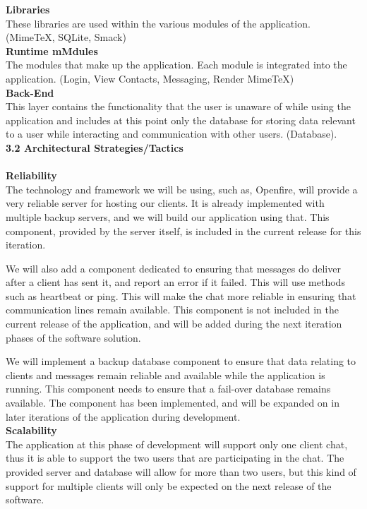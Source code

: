 \documentclass[29pt,a4paper]{moderncv}
\begin{document}
			\noindent\textbf{Libraries}\\
			These libraries are used within the various modules of the application. (MimeTeX, SQLite, Smack)\\
			
			\noindent\textbf{Runtime mMdules}\\
			The modules that make up the application.  Each module is integrated into the application. (Login, View Contacts, Messaging, Render MimeTeX)\\
			
			\noindent\textbf{Back-End}\\
			This layer contains the functionality that the user is unaware of while using the application and includes at this point only the database for storing data relevant to a user while interacting and communication with other users. (Database).\\
			
		\vspace{5mm}
\newpage		
		\noindent \textbf{3.2 Architectural Strategies/Tactics} \\
			\\ \textbf{Reliability} 
				\\The technology and framework we will be using, such as, Openfire, will provide a very reliable server for hosting our clients. It is already implemented with multiple backup servers, and we will build our application using that. This component, provided by the server itself, is included in the current release for this iteration.
				
				We will also add a component dedicated to ensuring that messages do deliver after a client has sent it, and report an error if it failed. This will use methods such as heartbeat or ping. This will make the chat more reliable in ensuring that communication lines remain available. This component is not included in the current release of the application, and will be added during the next iteration phases of the software solution. 
				
				We will implement a backup database component to ensure that data relating to clients and messages remain reliable and available while the application is running. This component needs to ensure that a fail-over database remains available. The component has been implemented, and will be expanded on in later iterations of the application during development.
				\\
			
			\noindent\textbf{Scalability}\\
				The application at this phase of development will support only one client chat, thus it is able to support the two users that are participating in the chat. The provided server and database will allow for more than two users, but this kind of support for multiple clients will only be expected on the next release of the software. 
				
\end{document}
